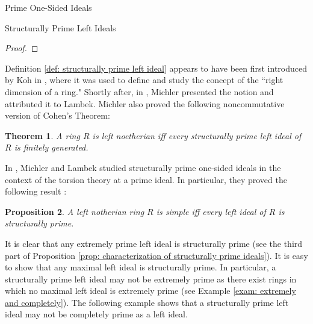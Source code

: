 \documentclass[11pt,a4paper]{article}
\theoremstyle{theorem}
\newtheorem{theorem}{Theorem}[section]
\newtheorem{proposition}[theorem]{Proposition}
\numberwithin{equation}{section}
\begin{document}
\begin{section}{Prime One-Sided Ideals}
\begin{subsection}{Structurally Prime Left Ideals}
\begin{proof}
 \end{proof}
 	Definition \ref{def: structurally prime left ideal} appears to have been first introduced by Koh in \cite{koh1971one}, where it was used to define and study the concept of the ``right dimension of a ring." Shortly after, in \cite{michler2014prime},  Michler presented the notion and attributed it to  Lambek. Michler also proved the following noncommutative version of Cohen’s Theorem:
 	\begin{theorem}\label{thm: Noncommutative Cohen using structurally prime left ideals}
 		A ring \( R \) is left noetherian iff every structurally prime left ideal of  \( R \)  is finitely generated. 
 	\end{theorem}
 	In \cite{lambek1973torsion}, Michler and  Lambek studied  structurally prime one-sided ideals in the context of the torsion theory at a prime ideal. In particular, they 
 	proved the following result \cite[Proposition 2.1]{lambek1973torsion}: 
 	\begin{proposition}\label{prop: simplicity using structurally prime left ideals}
 		A left notherian ring \( R \) is simple iff every left ideal of \( R \) is structurally prime. 
 	\end{proposition}
	It is clear that any extremely prime left ideal is structurally prime (see the third part of Proposition \ref{prop: characterization of structurally prime ideals}). It is easy to show that any maximal left ideal is structurally prime. In particular, a structurally prime left ideal may not be extremely prime as there exist rings in which no maximal left ideal is extremely prime (see Example \ref{exam: extremely and completely}). The following example shows that a structurally prime left ideal may not be completely prime as a left ideal.   
	

\end{subsection}
\end{section}
\end{document}
